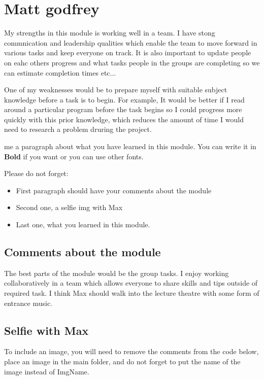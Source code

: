 \section{Matt godfrey}
My strengths in this module is working well in a team. I have stong commnication and leadership qualities which enable the team to move forward in various tasks and keep everyone on track. It is also important to update people on eahc others progress and what tasks people in the groups are completing so we can estimate completion times etc...

One of my weaknesses would be to prepare myself with suitable subject knowledge before a task is to begin. For example, It would be better if I read around a particular program before the task begins so I could progress more quickly with this prior knowledge, which reduces the amount of time I would need to research a problem druring the project. 

me a paragraph about what you have learned in this module. You can write it in \textbf{Bold} if you want or you can use other fonts. 

Please do not forget:
\begin{itemize}
	\item First paragraph should have your comments about the module
	\item Second one, a selfie img with Max
	\item Last one, what you learned in this module.
\end{itemize}

\subsection{Comments about the module}

The best parts of the module would be the group tasks. I enjoy working collaboratively in a team which allows everyone to share skills and tips outside of required task. I think Max should walk into the lecture theatre with some form of entrance music. 

\subsection{Selfie with Max}

To include an image, you will need to remove the comments from the code below, place an image in the main folder, and do not forget to put the name of the image instead of ImgName. 


